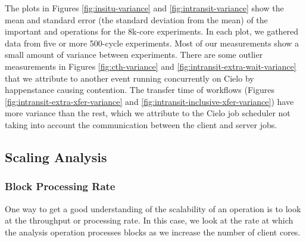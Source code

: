 The plots in Figures \ref{fig:insitu-variance} and
\ref{fig:intransit-variance} show the mean and standard error (the standard
deviation from the mean) of the important \insitu and \intransit operations
for the 8k-core experiments.  In each plot, we gathered data from five or
more 500-cycle experiments.  Most of our measurements show a small amount
of variance between experiments.  There are some outlier measurements in
Figures \ref{fig:cth-variance} and \ref{fig:intransit-extra-wait-variance}
that we attribute to another event running concurrently on Cielo by
happenstance causing contention.  The transfer time of \intransit workflows
(Figures \ref{fig:intransit-extra-xfer-variance} and
\ref{fig:intransit-inclusive-xfer-variance}) have more variance than the
rest, which we attribute to the Cielo job scheduler not taking into account
the communication between the client and server jobs.


\FloatBarrier


\subsection{Scaling Analysis}
\label{sec:node-scaling}

\subsubsection{Block Processing Rate}

One way to get a good understanding of the scalability of an operation is
to look at the throughput or processing rate.  In this case, we look at the
rate at which the analysis operation processes blocks as we increase the
number of client cores.




